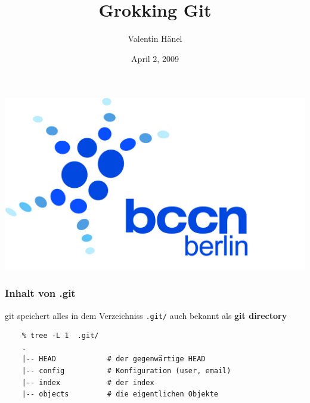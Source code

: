 \documentclass{beamer}
\author{Valentin H\"anel}
\institute{Bernstein Center for Computational Neuroscience Berlin}
\title{Grokking Git}
\date{April 2, 2009}
\begin{document}

\begin{frame}
	\includegraphics[scale=0.05]{BCCN_logo_berlin.jpg}
	\titlepage
\end{frame}



\begin{frame}[fragile]
\frametitle{Inhalt von .git}

git speichert alles in dem Verzeichniss {\tt.git/} auch bekannt als \textbf{git
directory}

\begin{verbatim}
    % tree -L 1  .git/
    .
    |-- HEAD            # der gegenwärtige HEAD
    |-- config          # Konfiguration (user, email)
    |-- index           # der index
    |-- objects         # die eigentlichen Objekte

\end{verbatim}

\end{frame}
\end{document}
